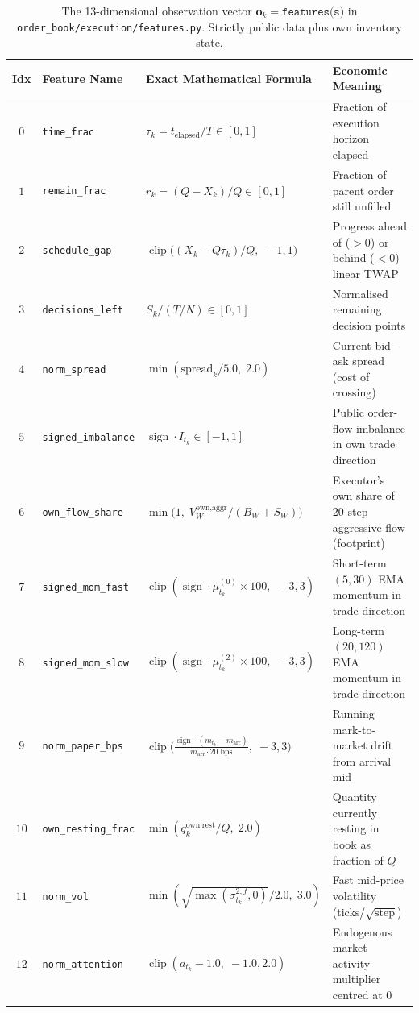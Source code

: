 \documentclass[11pt,a4paper]{article}
\newcommand{\code}[1]{\texttt{#1}}
\newcommand{\sign}{\operatorname{sign}}
\newcommand{\clip}{\operatorname{clip}}
\begin{document}
\begin{table}[h!]
\centering\small\setlength{\tabcolsep}{4pt}
\begin{tabular}{clL{5.6cm}L{5.4cm}}
\toprule
Idx & Feature Name & Exact Mathematical Formula & Economic Meaning \\
\midrule
$0$ & \code{time\_frac} & $\tau_k = t_{\text{elapsed}} / T \in [0, 1]$ & Fraction of execution horizon elapsed \\
$1$ & \code{remain\_frac} & $r_k = (Q - X_k) / Q \in [0, 1]$ & Fraction of parent order still unfilled \\
$2$ & \code{schedule\_gap} & $\clip\!\big((X_k - Q\tau_k)/Q,\; -1, 1\big)$ & Progress ahead of ($>0$) or behind ($<0$) linear TWAP \\
$3$ & \code{decisions\_left} & $S_k / (T/N) \in [0, 1]$ & Normalised remaining decision points \\
$4$ & \code{norm\_spread} & $\min(\text{spread}_k / 5.0,\; 2.0)$ & Current bid--ask spread (cost of crossing) \\
$5$ & \code{signed\_imbalance} & $\sign \cdot I_{t_k} \in [-1, 1]$ & Public order-flow imbalance in own trade direction \\
$6$ & \code{own\_flow\_share} & $\min\!\big(1,\; V^{\text{own,aggr}}_{W} / (B_W + S_W)\big)$ & Executor's own share of 20-step aggressive flow (footprint) \\
$7$ & \code{signed\_mom\_fast} & $\clip(\sign \cdot \mu^{(0)}_{t_k} \times 100,\; -3, 3)$ & Short-term $(5,30)$ EMA momentum in trade direction \\
$8$ & \code{signed\_mom\_slow} & $\clip(\sign \cdot \mu^{(2)}_{t_k} \times 100,\; -3, 3)$ & Long-term $(20,120)$ EMA momentum in trade direction \\
$9$ & \code{norm\_paper\_bps} & $\clip\!\big(\frac{\sign\cdot(m_{t_k} - m_{\text{arr}})}{m_{\text{arr}}\cdot 20\text{ bps}},\; -3, 3\big)$ & Running mark-to-market drift from arrival mid \\
$10$ & \code{own\_resting\_frac} & $\min(q^{\text{own,rest}}_k / Q,\; 2.0)$ & Quantity currently resting in book as fraction of $Q$ \\
$11$ & \code{norm\_vol} & $\min(\sqrt{\max(\sigma^{2,f}_{t_k}, 0)} / 2.0,\; 3.0)$ & Fast mid-price volatility (ticks/$\sqrt{\text{step}}$) \\
$12$ & \code{norm\_attention} & $\clip(a_{t_k} - 1.0,\; -1.0, 2.0)$ & Endogenous market activity multiplier centred at $0$ \\
\bottomrule
\end{tabular}
\caption{The 13-dimensional observation vector $\mathbf{o}_k = \code{features(s)}$ in
\code{order\_book/execution/features.py}. Strictly public data plus own inventory state.}
\label{tab:rl_features}
\end{table}
\end{document}
